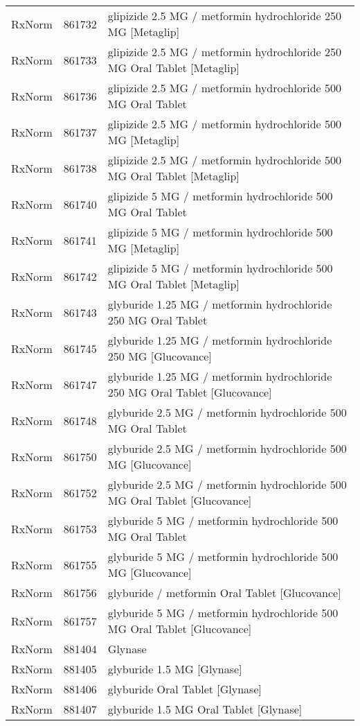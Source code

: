 \begin{longtable}{p{}p{}p{}}
  RxNorm & 861732 & glipizide 2.5 MG / metformin hydrochloride 250 MG [Metaglip] \\ 
  RxNorm & 861733 & glipizide 2.5 MG / metformin hydrochloride 250 MG Oral Tablet [Metaglip] \\ 
  RxNorm & 861736 & glipizide 2.5 MG / metformin hydrochloride 500 MG Oral Tablet \\ 
  RxNorm & 861737 & glipizide 2.5 MG / metformin hydrochloride 500 MG [Metaglip] \\ 
  RxNorm & 861738 & glipizide 2.5 MG / metformin hydrochloride 500 MG Oral Tablet [Metaglip] \\ 
  RxNorm & 861740 & glipizide 5 MG / metformin hydrochloride 500 MG Oral Tablet \\ 
  RxNorm & 861741 & glipizide 5 MG / metformin hydrochloride 500 MG [Metaglip] \\ 
  RxNorm & 861742 & glipizide 5 MG / metformin hydrochloride 500 MG Oral Tablet [Metaglip] \\ 
  RxNorm & 861743 & glyburide 1.25 MG / metformin hydrochloride 250 MG Oral Tablet \\ 
  RxNorm & 861745 & glyburide 1.25 MG / metformin hydrochloride 250 MG [Glucovance] \\ 
  RxNorm & 861747 & glyburide 1.25 MG / metformin hydrochloride 250 MG Oral Tablet [Glucovance] \\ 
  RxNorm & 861748 & glyburide 2.5 MG / metformin hydrochloride 500 MG Oral Tablet \\ 
  RxNorm & 861750 & glyburide 2.5 MG / metformin hydrochloride 500 MG [Glucovance] \\ 
  RxNorm & 861752 & glyburide 2.5 MG / metformin hydrochloride 500 MG Oral Tablet [Glucovance] \\ 
  RxNorm & 861753 & glyburide 5 MG / metformin hydrochloride 500 MG Oral Tablet \\ 
  RxNorm & 861755 & glyburide 5 MG / metformin hydrochloride 500 MG [Glucovance] \\ 
  RxNorm & 861756 & glyburide / metformin Oral Tablet [Glucovance] \\ 
  RxNorm & 861757 & glyburide 5 MG / metformin hydrochloride 500 MG Oral Tablet [Glucovance] \\ 
  RxNorm & 881404 & Glynase \\ 
  RxNorm & 881405 & glyburide 1.5 MG [Glynase] \\ 
  RxNorm & 881406 & glyburide Oral Tablet [Glynase] \\ 
  RxNorm & 881407 & glyburide 1.5 MG Oral Tablet [Glynase] \\ 

\end{longtable}

